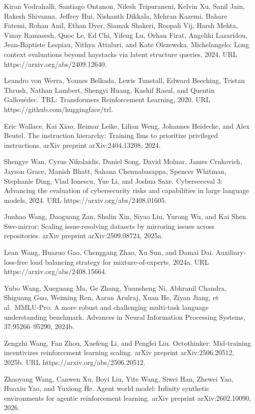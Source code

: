 \documentclass[
  10
]{article}
\begin{document}
Kiran Vodrahalli, Santiago Ontanon, Nilesh Tripuraneni, Kelvin Xu, Sanil
Jain, Rakesh Shivanna, Jeffrey Hui, Nishanth Dikkala, Mehran Kazemi,
Bahare Fatemi, Rohan Anil, Ethan Dyer, Siamak Shakeri, Roopali Vij,
Harsh Mehta, Vinay Ramasesh, Quoc Le, Ed Chi, Yifeng Lu, Orhan Firat,
Angeliki Lazaridou, Jean-Baptiste Lespiau, Nithya Attaluri, and Kate
Olszewska. Michelangelo: Long context evaluations beyond haystacks via
latent structure queries, 2024. URL https://arxiv.org/abs/2409.12640.

Leandro von Werra, Younes Belkada, Lewis Tunstall, Edward Beeching,
Tristan Thrush, Nathan Lambert, Shengyi Huang, Kashif Rasul, and Quentin
Gallouédec. TRL: Transformers Reinforcement Learning, 2020. URL
https://github.com/huggingface/trl.

Eric Wallace, Kai Xiao, Reimar Leike, Lilian Weng, Johannes Heidecke,
and Alex Beutel. The instruction hierarchy: Training llms to prioritize
privileged instructions. arXiv preprint arXiv:2404.13208, 2024.

Shengye Wan, Cyrus Nikolaidis, Daniel Song, David Molnar, James
Crnkovich, Jayson Grace, Manish Bhatt, Sahana Chennabasappa, Spencer
Whitman, Stephanie Ding, Vlad Ionescu, Yue Li, and Joshua Saxe.
Cyberseceval 3: Advancing the evaluation of cybersecurity risks and
capabilities in large language models, 2024. URL
https://arxiv.org/abs/2408.01605.

Junhao Wang, Daoguang Zan, Shulin Xin, Siyao Liu, Yurong Wu, and Kai
Shen. Swe-mirror: Scaling issue-resolving datasets by mirroring issues
across repositories. arXiv preprint arXiv:2509.08724, 2025a.

Lean Wang, Huazuo Gao, Chenggang Zhao, Xu Sun, and Damai Dai.
Auxiliary-loss-free load balancing strategy for mixture-of-experts,
2024a. URL https://arxiv.org/abs/2408.15664.

Yubo Wang, Xueguang Ma, Ge Zhang, Yuansheng Ni, Abhranil Chandra,
Shiguang Guo, Weiming Ren, Aaran Arulraj, Xuan He, Ziyan Jiang, et
al.~MMLU-Pro: A more robust and challenging multi-task language
understanding benchmark. Advances in Neural Information Processing
Systems, 37:95266--95290, 2024b.

Zengzhi Wang, Fan Zhou, Xuefeng Li, and Pengfei Liu. Octothinker:
Mid-training incentivizes reinforcement learning scaling. arXiv preprint
arXiv:2506.20512, 2025b. URL https://arxiv.org/abs/2506.20512.

Zhaoyang Wang, Canwen Xu, Boyi Liu, Yite Wang, Siwei Han, Zhewei Yao,
Huaxiu Yao, and Yuxiong He. Agent world model: Infinity synthetic
environments for agentic reinforcement learning. arXiv preprint
arXiv:2602.10090, 2026.
\end{document}
